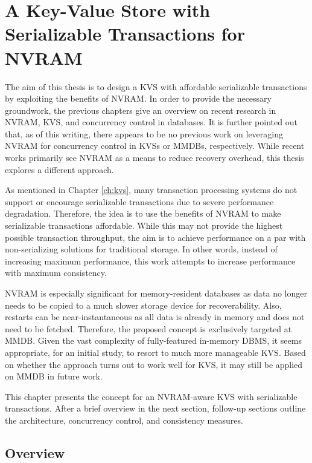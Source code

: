 \chapter{A Key-Value Store with Serializable Transactions for NVRAM}
\label{ch:concept}

The aim of this thesis is to design a \ac{KVS} with affordable serializable
transactions by exploiting the benefits of \ac{NVRAM}. In order to provide the
necessary groundwork, the previous chapters give an overview on recent research
in \ac{NVRAM}, \ac{KVS}, and concurrency control in databases. It is further
pointed out that, as of this writing, there appears to be no previous work on
leveraging \ac{NVRAM} for concurrency control in \acp{KVS} or \acp{MMDB},
respectively. While recent works primarily see \ac{NVRAM} as a means to reduce
recovery overhead, this thesis explores a different approach.

As mentioned in Chapter \ref{ch:kvs}, many transaction processing systems do not
support or encourage serializable transactions due to severe performance
degradation. Therefore, the idea is to use the benefits of \ac{NVRAM} to make
serializable transactions affordable. While this may not provide the highest
possible transaction throughput, the aim is to achieve performance on a par with
non-serializing solutions for traditional storage. In other words, instead of
increasing maximum performance, this work attempts to increase performance with
maximum consistency.

\ac{NVRAM} is especially significant for memory-resident databases as data no
longer needs to be copied to a much slower storage device for recoverability.
Also, restarts can be near-instantaneous as all data is already in memory and
does not need to be fetched. Therefore, the proposed concept is exclusively
targeted at \ac{MMDB}. Given the vast complexity of fully-featured in-memory
\ac{DBMS}, it seems appropriate, for an initial study, to resort to much more
manageable \ac{KVS}. Based on whether the approach turns out to work well for
\ac{KVS}, it may still be applied on \ac{MMDB} in future work.

This chapter presents the concept for an \ac{NVRAM}-aware \ac{KVS} with
serializable transactions. After a brief overview in the next section,
follow-up sections outline the architecture, concurrency control, and
consistency measures.

\section{Overview}
\label{ch:concept-overview}


